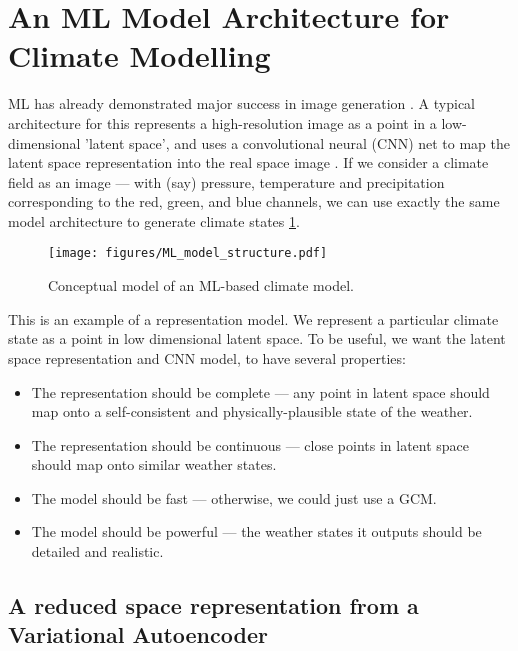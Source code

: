 \documentclass[gmd]{copernicus}
\begin{document}
\section{An ML Model Architecture for Climate Modelling}

ML has already demonstrated major success in image generation \citep{StyleGAN2,Stable_Diffusion}. A typical architecture for this represents a high-resolution image as a point in a low-dimensional 'latent space', and uses a convolutional neural (CNN) net to map the latent space representation into the real space image \citep{StyleGAN}. If we consider a climate field as an image --- with (say) pressure, temperature and precipitation corresponding to the red, green, and blue channels, we can use exactly the same model architecture to generate climate states \ref{ML_model_structure}.

\begin{figure}[h]
\texttt{[image: figures/ML\_model\_structure.pdf]}
\caption{Conceptual model of an ML-based climate model.}
\label{ML_model_structure}
\end{figure}

This is an example of a representation model. We represent a particular climate state as a point in low dimensional latent space. To be useful, we want the latent space representation and CNN model, to have several properties:
\begin{itemize}
    \item The representation should be complete --- any point in latent space should map onto a self-consistent and physically-plausible state of the weather.
    \item The representation should be continuous --- close points in latent space should map onto similar weather states.
    \item The model should be fast --- otherwise, we could just use a GCM.
    \item The model should be powerful --- the weather states it outputs should be detailed and realistic.
\end{itemize}

    
\subsection{A reduced space representation from a Variational Autoencoder}
\end{document}
